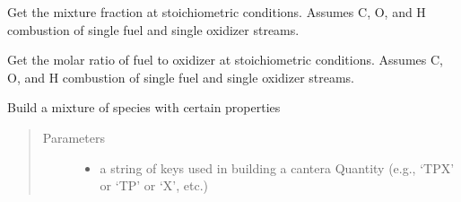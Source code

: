 \documentclass[letterpaper,10pt,english]{sphinxmanual}
\begin{document}
\begin{fulllineitems}
\begin{fulllineitems}
\end{fulllineitems}


\begin{fulllineitems}
\label{\detokenize{spitfire.chemistry.mechanism:spitfire.chemistry.mechanism.ChemicalMechanismSpec.stoich_mixture_fraction}}
Get the mixture fraction at stoichiometric conditions.
Assumes C, O, and H combustion of single fuel and single oxidizer streams.

\end{fulllineitems}


\begin{fulllineitems}
\label{\detokenize{spitfire.chemistry.mechanism:spitfire.chemistry.mechanism.ChemicalMechanismSpec.stoich_molar_fuel_to_oxy_ratio}}
Get the molar ratio of fuel to oxidizer at stoichiometric conditions.
Assumes C, O, and H combustion of single fuel and single oxidizer streams.

\end{fulllineitems}


\begin{fulllineitems}
\label{\detokenize{spitfire.chemistry.mechanism:spitfire.chemistry.mechanism.ChemicalMechanismSpec.stream}}
Build a mixture of species with certain properties
\begin{quote}\begin{description}
\item[{Parameters}] \leavevmode\begin{itemize}
\item {} 
 \textendash{} a string of keys used in building a cantera Quantity (e.g., ‘TPX’ or ‘TP’ or ‘X’, etc.)


\end{itemize}
\end{description}
\end{quote}
\end{fulllineitems}
\end{fulllineitems}
\end{document}
